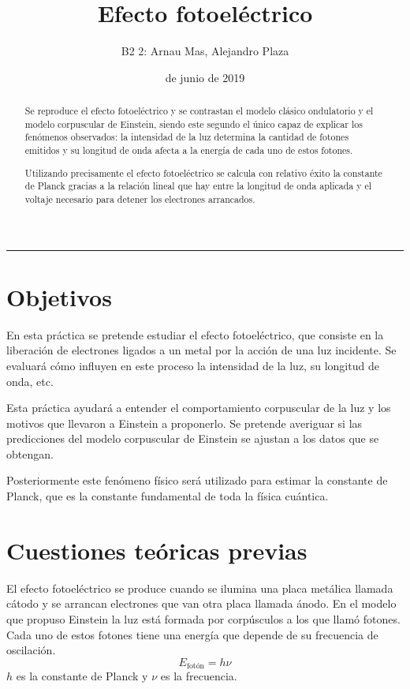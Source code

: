 \documentclass[12pt]{article}
\title{\sffamily {\bfseries Práctica 10:} Efecto fotoeléctrico}
\author{\sffamily B2 2: Arnau Mas, Alejandro Plaza}
\date{\sffamily 6 de junio de 2019}
\numberwithin{table}{section}
\numberwithin{figure}{section}
\numberwithin{equation}{section}
\begin{document}
\maketitle
\renewcommand{\abstractname}{\sffamily \bfseries Resumen:}
\begin{abstract}
	Se reproduce el efecto fotoeléctrico y se contrastan el modelo clásico ondulatorio y el modelo corpuscular de Einstein, siendo este segundo el único capaz de explicar los fenómenos observados: la intensidad de la luz determina la cantidad de fotones emitidos y su longitud de onda afecta a la energía de cada uno de estos fotones.
	
	Utilizando precisamente el efecto fotoeléctrico se calcula con relativo éxito la constante de Planck gracias a la relación lineal que hay entre la longitud de onda aplicada y el voltaje necesario para detener los electrones arrancados.
\end{abstract}
\hrule

\section{Objetivos}
En esta práctica se pretende estudiar el efecto fotoeléctrico, que consiste en la liberación de electrones ligados a un metal por la acción de una luz incidente. Se evaluará cómo influyen en este proceso la intensidad de la luz, su longitud de onda, etc.

Esta práctica ayudará a entender el comportamiento corpuscular de la luz y los motivos que llevaron a Einstein a proponerlo. Se pretende averiguar si las predicciones del modelo corpuscular de Einstein se ajustan a los datos que se obtengan.

Posteriormente este fenómeno físico será utilizado para estimar la constante de Planck, que es la constante fundamental de toda la física cuántica.

\section{Cuestiones teóricas previas}
El efecto fotoeléctrico se produce cuando se ilumina una placa metálica llamada cátodo y se arrancan electrones que van otra placa llamada ánodo. En el modelo que propuso Einstein la luz está formada por corpúsculos a los que llamó fotones. Cada uno de estos fotones tiene una energía que depende de su frecuencia de oscilación.
\begin{equation}\label{P10Efoton}
	E_{\text{fotón}}=h\nu
\end{equation}
$h$ es la constante de Planck y $\nu$ es la frecuencia.
\end{document}
